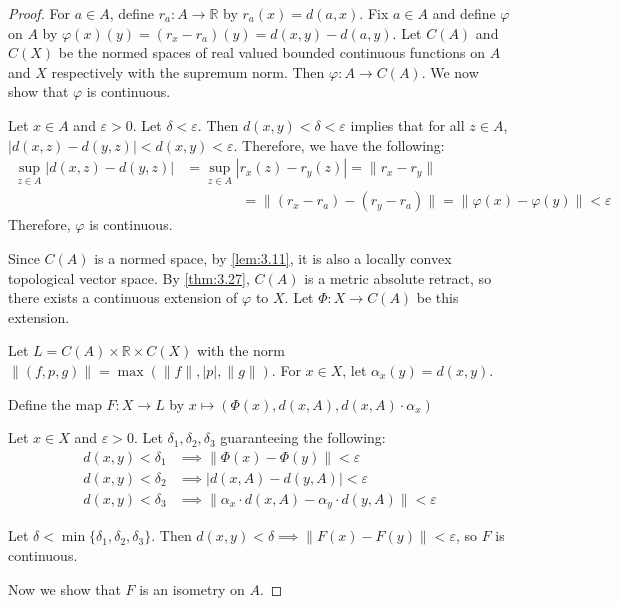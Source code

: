 \documentclass[openany, amssymb, psamsfonts]{amsart}
\let\fullref\autoref
\theoremstyle{definition}
\numberwithin{equation}{section}
\begin{document}
\begin{proof}
  For $a \in A$, define $r_a: A \to \mathbb R$ by $r_a(x) = d(a,x)$. Fix $a \in A$ and define $\varphi$ on $A$ by $\varphi(x)(y) = (r_x - r_a)(y) = d(x,y) - d(a,y)$. Let $C(A)$ and $C(X)$ be the normed spaces of real valued bounded continuous functions on $A$ and $X$ respectively with the supremum norm. Then $\varphi:A \to C(A)$. We now show that $\varphi$ is continuous.

  Let $x \in A$ and $\varepsilon > 0$. Let $\delta < \varepsilon$. Then $d(x,y) < \delta < \varepsilon$ implies that for all $z \in A$, $|d(x,z) - d(y,z)| < d(x,y) < \varepsilon$. Therefore, we have the following:
  \begin{align*}
    \sup_{z\in A} |d(x,z) - d(y,z)| &= \sup_{z\in A} |r_x(z) - r_y(z)| = \|r_x - r_y\| \\
                                    &\qquad \qquad = \|(r_x - r_a) - (r_y - r_a) \| = \| \varphi(x) - \varphi(y)\| < \varepsilon
  \end{align*}
  Therefore, $\varphi$ is continuous. 

  Since $C(A)$ is a normed space, by \fullref{lem:3.11}, it is also a locally convex topological vector space. By \fullref{thm:3.27}, $C(A)$ is a metric absolute retract, so there exists a continuous extension of $\varphi$ to $X$. Let $\Phi: X \to C(A)$ be this extension.

  Let $L = C(A) \times \mathbb R \times C(X)$ with the norm $\|(f, p, g)\| = \max (\|f\|, |p|, \|g\|)$. For $x\in X$, let $\alpha_x(y) = d(x,y)$. 

  Define the map $F: X \to L$ by $x \mapsto (\Phi(x), d(x, A), d(x,A)\cdot \alpha_x)$

  Let $x \in X$ and $\varepsilon > 0$. Let $\delta_1, \delta_2, \delta_3$ guaranteeing the following:
  \begin{align*}
    d(x,y) < \delta_1 &\implies \|\Phi(x) - \Phi(y)\| < \varepsilon\\
    d(x,y) < \delta_2 &\implies |d(x,A) - d(y,A)| < \varepsilon\\
    d(x,y) < \delta_3 &\implies \|\alpha_x \cdot d(x,A) - \alpha_y \cdot d(y,A)\| < \varepsilon
  \end{align*} 

  Let $\delta < \min\{\delta_1, \delta_2, \delta_3\}$. Then $d(x,y) < \delta \implies \|F(x) - F(y)\| < \varepsilon$, so $F$ is continuous. 

  Now we show that $F$ is an isometry on $A$. 


\end{proof}
\end{document}
